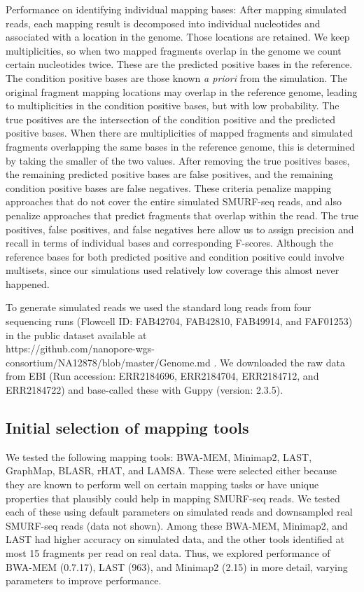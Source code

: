 Performance on identifying individual mapping bases: After mapping
simulated reads, each mapping result is decomposed into individual
nucleotides and associated with a location in the genome. Those
locations are retained. We keep multiplicities, so when two mapped
fragments overlap in the genome we count certain nucleotides twice.
These are the predicted positive bases in the reference.  The condition
positive bases are those known \textit{a priori} from the simulation.
The original fragment mapping locations may overlap in the reference
genome, leading to multiplicities in the condition positive bases, but
with low probability. The true positives are the intersection of the
condition positive and the predicted positive bases. When there are
multiplicities of mapped fragments and simulated fragments overlapping
the same bases in the reference genome, this is determined by taking the
smaller of the two values. After removing the true positives bases, the
remaining predicted positive bases are false positives, and the
remaining condition positive bases are false negatives. These criteria
penalize mapping approaches that do not cover the entire simulated
SMURF-seq reads, and also penalize approaches that predict fragments
that overlap within the read. The true positives, false positives, and
false negatives here allow us to assign precision and recall in terms of
individual bases and corresponding F-scores. Although the reference
bases for both predicted positive and condition positive could involve
multisets, since our simulations used relatively low coverage this
almost never happened.

To generate simulated reads we used the standard long reads from four
sequencing runs (Flowcell ID: FAB42704, FAB42810, FAB49914, and
FAF01253) in the public dataset available at \\
https://github.com/nanopore-wgs-consortium/NA12878/blob/master/Genome.md
\citep{jain2018nanopore,jain2018nanopore_git}. We downloaded the raw data
from EBI (Run accession: ERR2184696, ERR2184704, ERR2184712, and
ERR2184722) and base-called these with Guppy (version: 2.3.5).


\subsection{Initial selection of mapping tools}
We tested the following mapping tools: BWA-MEM\citep{li2013aligning},
Minimap2\citep{li2018minimap2}, LAST\citep{kielbasa2011adaptive},
GraphMap\citep{sovic2016fast}, BLASR\citep{chaisson2012mapping},
rHAT\citep{liu2015rhat}, and LAMSA\citep{liu2017lamsa}. These were
selected either because they are known to perform well on certain
mapping tasks or have unique properties that plausibly could help in
mapping SMURF-seq reads. We tested each of these using default
parameters on simulated reads and downsampled real SMURF-seq
reads (data not shown). Among these BWA-MEM, Minimap2, and LAST had
higher accuracy on simulated data, and the other tools identified at
most 15 fragments per read on real data. Thus, we explored performance
of BWA-MEM (0.7.17), LAST (963), and Minimap2 (2.15) in more detail,
varying parameters to improve performance.

